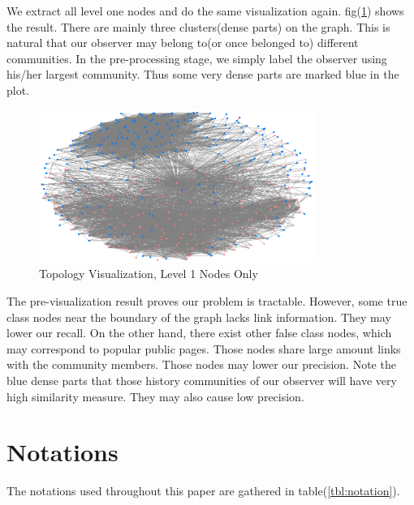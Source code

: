 \documentclass[11pt,a4paper]{article}
\begin{document}
We extract all level one nodes and do the same visualization again. 
fig(\ref{fig:topo_vis_l1}) shows the result. There are mainly three
clusters(dense parts) on the graph. This is natural that our observer
may belong to(or once belonged to) different communities. In the 
pre-processing stage, we simply label the observer using his/her 
largest community. Thus some very dense parts are marked blue in 
the plot.  

\begin{figure}[htb]
	\centering
	\includegraphics[width=0.8\textwidth]{../visualization/NodeXL_ClassNo.png}
	\caption{Topology Visualization, Level 1 Nodes Only}
	\label{fig:topo_vis_l1}
\end{figure}

The pre-visualization result proves our problem is tractable. However, 
some true class nodes near the boundary of the graph lacks link information. 
They may lower our recall. On the other hand, there exist other false class 
nodes, which may correspond to popular public pages. Those nodes share 
large amount links with the community members. Those nodes may lower
our precision. Note the blue dense parts that those history communities
of our observer will have very high similarity measure. They may also
cause low precision. 

\section{Notations}

The notations used throughout this paper are gathered 
in table(\ref{tbl:notation}). 
\end{document}
